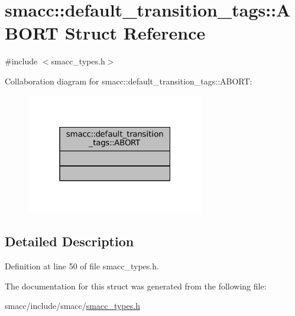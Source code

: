 \hypertarget{structsmacc_1_1default__transition__tags_1_1ABORT}{}\section{smacc\+:\+:default\+\_\+transition\+\_\+tags\+:\+:A\+B\+O\+RT Struct Reference}
\label{structsmacc_1_1default__transition__tags_1_1ABORT}


{\ttfamily \#include $<$smacc\+\_\+types.\+h$>$}



Collaboration diagram for smacc\+:\+:default\+\_\+transition\+\_\+tags\+:\+:A\+B\+O\+RT\+:
\nopagebreak
\begin{figure}[H]
\begin{center}
\leavevmode
\includegraphics[width=220pt]{structsmacc_1_1default__transition__tags_1_1ABORT__coll__graph}
\end{center}
\end{figure}


\subsection{Detailed Description}


Definition at line 50 of file smacc\+\_\+types.\+h.



The documentation for this struct was generated from the following file\+:\begin{DoxyCompactItemize}
\item 
smacc/include/smacc/\hyperlink{smacc__types_8h}{smacc\+\_\+types.\+h}\end{DoxyCompactItemize}
